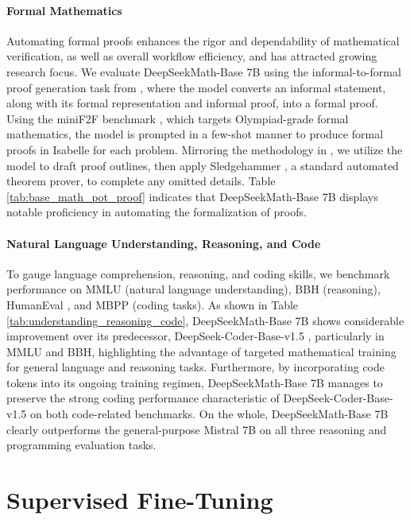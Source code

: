 \paragraph{Formal Mathematics}

Automating formal proofs enhances the rigor and dependability of mathematical verification, as well as overall workflow efficiency, and has attracted growing research focus. We evaluate DeepSeekMath-Base 7B using the informal-to-formal proof generation task from \citep{dsp_proof}, where the model converts an informal statement, along with its formal representation and informal proof, into a formal proof. Using the miniF2F benchmark \citep{minif2f}, which targets Olympiad-grade formal mathematics, the model is prompted in a few-shot manner to produce formal proofs in Isabelle for each problem. Mirroring the methodology in \cite{dsp_proof}, we utilize the model to draft proof outlines, then apply Sledgehammer \citep{sledgehammer}, a standard automated theorem prover, to complete any omitted details. Table \ref{tab:base_math_pot_proof} indicates that DeepSeekMath-Base 7B displays notable proficiency in automating the formalization of proofs.

\paragraph{Natural Language Understanding, Reasoning, and Code}

To gauge language comprehension, reasoning, and coding skills, we benchmark performance on MMLU \citep{mmlu} (natural language understanding), BBH \citep{bbh} (reasoning), HumanEval \citep{codex}, and MBPP \citep{mbpp} (coding tasks). As shown in Table \ref{tab:understanding_reasoning_code}, DeepSeekMath-Base 7B shows considerable improvement over its predecessor, DeepSeek-Coder-Base-v1.5 \citep{deepseek-coder}, particularly in MMLU and BBH, highlighting the advantage of targeted mathematical training for general language and reasoning tasks. Furthermore, by incorporating code tokens into its ongoing training regimen, DeepSeekMath-Base 7B manages to preserve the strong coding performance characteristic of DeepSeek-Coder-Base-v1.5 on both code-related benchmarks. On the whole, DeepSeekMath-Base 7B clearly outperforms the general-purpose Mistral 7B \citep{mistral} on all three reasoning and programming evaluation tasks.

\section{Supervised Fine-Tuning}

